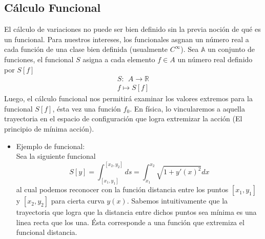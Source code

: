 \documentclass[12pt]{report}
\begin{document}
\subsection{Cálculo Funcional}
El cálculo de variaciones no puede ser bien definido sin la previa noción de qué es un funcional. Para nuestros intereses, los funcionales asgnan un número real a cada función de una clase bien definida (usualmente $C^\infty$). Sea $\mathbb{A}$ un conjunto de funciones, el funcional $S$ asigna a cada elemento $f\in\mathit{A}$ un número real definido por $S[f]$
\begin{eqnarray}
S:\ \ \mathit{A}\longrightarrow\mathbb{R} \\
f\longmapsto S[f] \nonumber
\end{eqnarray}
Luego, el cálculo funcional nos permitirá examinar los valores extremos para la funcional $S[f]$, ésta vez una función $f_0$. En física, lo vincularemos a aquella trayectoria en el espacio de configuración que logra extremizar la acción (El principio de mínima acción).
\begin{itemize}
\item Ejemplo de funcional: \\
Sea la siguiente funcional
\begin{equation}
S[y]=\int_{[x_1,y_1]}^{[x_2,y_2]}ds=\int_{x_1}^{x_2}\sqrt{1+y'(x)^2}dx
\end{equation}
al cual podemos reconocer con la función distancia entre los puntos $[x_1,y_1]$ y $[x_2,y_2]$ para cierta curva $y(x)$. Sabemos intuitivamente que la trayectoria que logra que la distancia entre dichos puntos sea mínima es una linea recta que los una. Ésta corresponde a una función que extremiza el funcional distancia.
\end{itemize}
\end{document}

